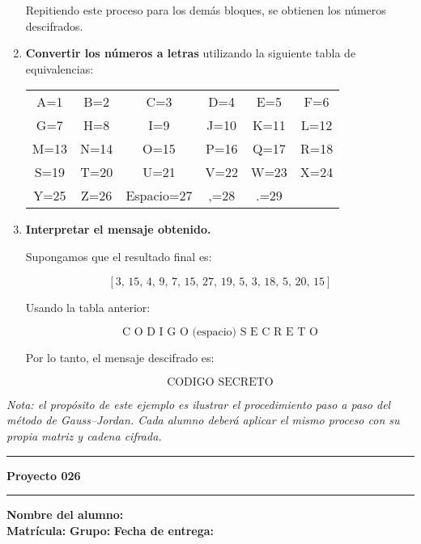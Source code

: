 \documentclass{article}%
\begin{document}
\begin{enumerate}
    Repitiendo este proceso para los demás bloques, se obtienen los números descifrados.

    \item \textbf{Convertir los números a letras} utilizando la siguiente tabla de equivalencias:

    \begin{center}
    \renewcommand{\arraystretch}{1.2}
    \small
    \begin{tabular}{cccccc}
    A=1 & B=2 & C=3 & D=4 & E=5 & F=6 \\
    G=7 & H=8 & I=9 & J=10 & K=11 & L=12 \\
    M=13 & N=14 & O=15 & P=16 & Q=17 & R=18 \\
    S=19 & T=20 & U=21 & V=22 & W=23 & X=24 \\
    Y=25 & Z=26 & Espacio=27 & ,=28 & .=29 &
    \end{tabular}
    \end{center}

    \item \textbf{Interpretar el mensaje obtenido.}

    Supongamos que el resultado final es:

    \[
    [3,\, 15,\, 4,\, 9,\, 7,\, 15,\, 27,\, 19,\, 5,\, 3,\, 18,\, 5,\, 20,\, 15]
    \]

    Usando la tabla anterior:

    \[
    \text{C O D I G O (espacio) S E C R E T O}
    \]

    Por lo tanto, el mensaje descifrado es:

    \[
    \boxed{\text{CODIGO SECRETO}}
    \]
\end{enumerate}

\bigskip
\textit{Nota: el propósito de este ejemplo es ilustrar el procedimiento paso a paso del método de Gauss–Jordan.
Cada alumno deberá aplicar el mismo proceso con su propia matriz y cadena cifrada.}

\bigskip
\hrule
\bigskip%

\newpage
\vspace{0.5em}
\noindent\textbf{Proyecto 026}\\%
\noindent\hrule
\vspace{1em}

\noindent\textbf{Nombre del alumno:} \underline{\hspace{11.8cm}}\\[8pt]
\noindent\textbf{Matrícula:} \underline{\hspace{4cm}} 
\textbf{Grupo:} \underline{\hspace{1.9cm}}
\textbf{Fecha de entrega:} \underline{\hspace{2.5cm}}\\[12pt]
\end{document}
